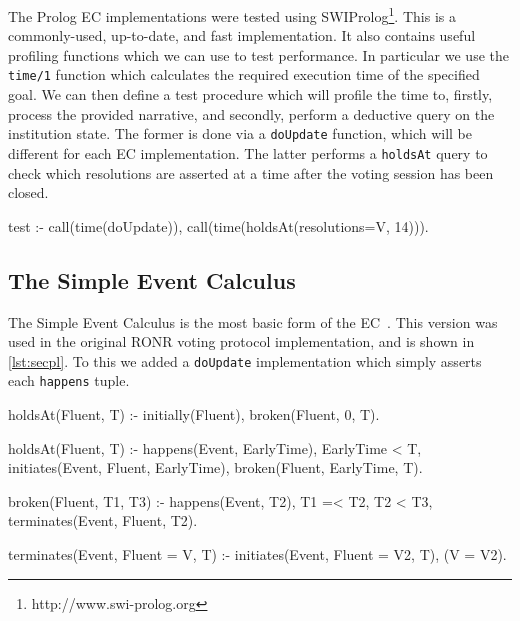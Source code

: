 The Prolog \ac{EC} implementations were tested using SWIProlog\footnote{http://www.swi-prolog.org}.
This is a commonly-used, up-to-date, and fast implementation. It also contains useful
profiling functions which we can use to test performance. In particular we use
the \texttt{time/1} function which calculates the required execution time of the
specified goal. We can then define a test procedure which will profile
the time to, firstly, process the provided narrative, and secondly, perform a
deductive query on the institution state. The former is done via a \texttt{doUpdate}
function, which will be different for each \ac{EC} implementation. The latter
performs a \texttt{holdsAt} query to check which resolutions are asserted at a
time after the voting session has been closed.

\begin{prologinline}
test :-
	call(time(doUpdate)),
	call(time(holdsAt(resolutions=V, 14))).
\end{prologinline}

\subsection{The Simple Event Calculus}

The Simple Event Calculus is the most basic form of the \ac{EC}~\citep{Shanahan1999}.
This version was used in the original \ac{RONR} voting protocol implementation, and is shown in \autoref{lst:secpl}. To this we added a \texttt{doUpdate} implementation which simply asserts each
\texttt{happens} tuple.

\begin{prolog}[caption=Prolog implementation of the Simple Event Calculus,label=lst:secpl]
holdsAt(Fluent, T) :-
	initially(Fluent),
	\+ broken(Fluent, 0, T).

holdsAt(Fluent, T) :-
	happens(Event, EarlyTime),
	EarlyTime < T,
	initiates(Event, Fluent, EarlyTime),
	\+ broken(Fluent, EarlyTime, T).

broken(Fluent, T1, T3) :-
	happens(Event, T2),
	T1 =< T2,
	T2 < T3,
	terminates(Event, Fluent, T2).

terminates(Event, Fluent = V, T) :-
	initiates(Event, Fluent = V2, T),
	\+ (V = V2).
\end{prolog}



